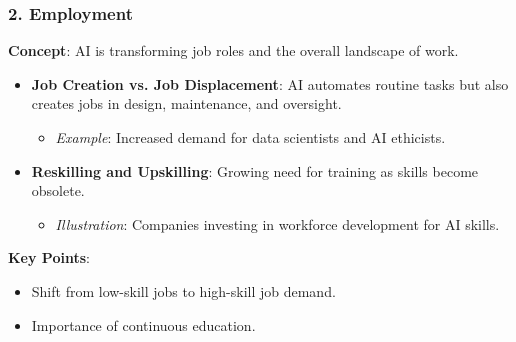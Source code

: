 \documentclass[aspectratio=169]{beamer}
\begin{document}
\begin{frame}[fragile]
    \frametitle{2. Employment}
    \textbf{Concept}: AI is transforming job roles and the overall landscape of work.

    \begin{itemize}
        \item \textbf{Job Creation vs. Job Displacement}: AI automates routine tasks but also creates jobs in design, maintenance, and oversight.
        \begin{itemize}
            \item \textit{Example}: Increased demand for data scientists and AI ethicists.
        \end{itemize}
        
        \item \textbf{Reskilling and Upskilling}: Growing need for training as skills become obsolete.
        \begin{itemize}
            \item \textit{Illustration}: Companies investing in workforce development for AI skills.
        \end{itemize}
    \end{itemize}
    
    \textbf{Key Points}:
    \begin{itemize}
        \item Shift from low-skill jobs to high-skill job demand.
        \item Importance of continuous education.
    \end{itemize}
\end{frame}
\end{document}
